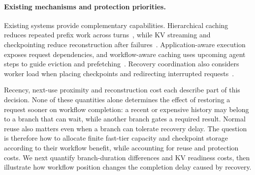 \paragraph{Existing mechanisms and protection priorities.}
Existing systems provide complementary capabilities. Hierarchical
caching reduces repeated prefix work across
turns~\cite{gao2024cachedattention,qin2025mooncake}, while KV streaming
and checkpointing reduce reconstruction after
failures~\cite{strati2024dejavu,jayakody2026ghostserve}.
Application-aware execution exposes request dependencies, and
workflow-aware caching uses upcoming agent steps to guide eviction and
prefetching~\cite{lin2024parrot,pan2025kvflow}.
Recovery coordination also considers worker load when placing checkpoints
and redirecting interrupted requests~\cite{cao2026lumen}.

Recency, next-use proximity and reconstruction cost each describe part
of this decision. None of these quantities alone determines the effect
of restoring a request sooner on workflow completion: a recent or
expensive history may belong to a branch that can wait, while another
branch gates a required result. Normal reuse also matters even when a
branch can tolerate recovery delay. The question is therefore how to
allocate finite fast-tier capacity and checkpoint storage according to
their workflow benefit, while accounting for reuse and protection costs.
We next quantify branch-duration differences and KV readiness costs,
then illustrate how workflow position changes the completion delay
caused by recovery.

